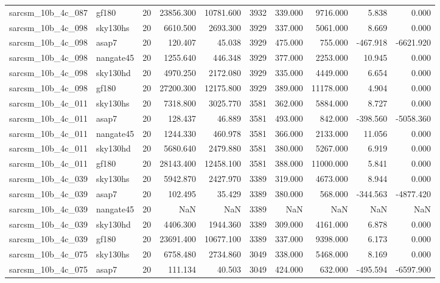 \documentclass{article}
\begin{document}
\begin{longtable}{llrrrrrrrr}
sarcsm\_10b\_4c\_087 & gf180 & 20 & 23856.300 & 10781.600 & 3932 & 339.000 & 9716.000 & 5.838 & 0.000 \\
sarcsm\_10b\_4c\_098 & sky130hs & 20 & 6610.500 & 2693.300 & 3929 & 337.000 & 5061.000 & 8.669 & 0.000 \\
sarcsm\_10b\_4c\_098 & asap7 & 20 & 120.407 & 45.038 & 3929 & 475.000 & 755.000 & -467.918 & -6621.920 \\
sarcsm\_10b\_4c\_098 & nangate45 & 20 & 1255.640 & 446.348 & 3929 & 377.000 & 2253.000 & 10.945 & 0.000 \\
sarcsm\_10b\_4c\_098 & sky130hd & 20 & 4970.250 & 2172.080 & 3929 & 335.000 & 4449.000 & 6.654 & 0.000 \\
sarcsm\_10b\_4c\_098 & gf180 & 20 & 27200.300 & 12175.800 & 3929 & 389.000 & 11178.000 & 4.904 & 0.000 \\
sarcsm\_10b\_4c\_011 & sky130hs & 20 & 7318.800 & 3025.770 & 3581 & 362.000 & 5884.000 & 8.727 & 0.000 \\
sarcsm\_10b\_4c\_011 & asap7 & 20 & 128.437 & 46.889 & 3581 & 493.000 & 842.000 & -398.560 & -5058.360 \\
sarcsm\_10b\_4c\_011 & nangate45 & 20 & 1244.330 & 460.978 & 3581 & 366.000 & 2133.000 & 11.056 & 0.000 \\
sarcsm\_10b\_4c\_011 & sky130hd & 20 & 5680.640 & 2479.880 & 3581 & 380.000 & 5267.000 & 6.919 & 0.000 \\
sarcsm\_10b\_4c\_011 & gf180 & 20 & 28143.400 & 12458.100 & 3581 & 388.000 & 11000.000 & 5.841 & 0.000 \\
sarcsm\_10b\_4c\_039 & sky130hs & 20 & 5942.870 & 2427.970 & 3389 & 319.000 & 4673.000 & 8.944 & 0.000 \\
sarcsm\_10b\_4c\_039 & asap7 & 20 & 102.495 & 35.429 & 3389 & 380.000 & 568.000 & -344.563 & -4877.420 \\
sarcsm\_10b\_4c\_039 & nangate45 & 20 & NaN & NaN & 3389 & NaN & NaN & NaN & NaN \\
sarcsm\_10b\_4c\_039 & sky130hd & 20 & 4406.300 & 1944.360 & 3389 & 309.000 & 4161.000 & 6.878 & 0.000 \\
sarcsm\_10b\_4c\_039 & gf180 & 20 & 23691.400 & 10677.100 & 3389 & 337.000 & 9398.000 & 6.173 & 0.000 \\
sarcsm\_10b\_4c\_075 & sky130hs & 20 & 6758.480 & 2734.860 & 3049 & 338.000 & 5468.000 & 8.169 & 0.000 \\
sarcsm\_10b\_4c\_075 & asap7 & 20 & 111.134 & 40.503 & 3049 & 424.000 & 632.000 & -495.594 & -6597.900 \\

\end{longtable}
\end{document}
